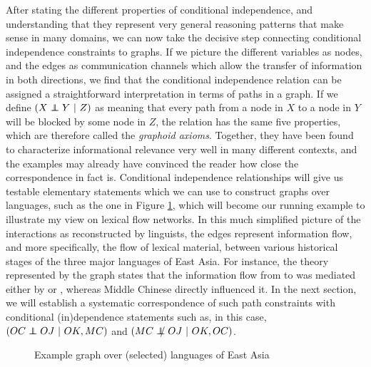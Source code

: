 After stating the different properties of conditional independence, and understanding that they represent very general reasoning patterns that make sense in many domains, we can now take the decisive step connecting conditional independence constraints to graphs. If we picture the different variables as nodes, and the edges as communication channels which allow the transfer of information in both directions, we find that the conditional independence relation can be assigned a straightforward interpretation in terms of paths in a graph. If we define $(X \independent Y\ |\ Z)$ as meaning that every path from a node in $X$ to a node in $Y$ will be blocked by some node in $Z$, the relation has the same five properties, which are therefore called the \textit{graphoid axioms}. Together, they have been found to characterize informational relevance very well in many different contexts, and the examples may already have convinced the reader how close the correspondence in fact is. Conditional 
independence relationships will give us testable elementary statements which we can use to construct graphs over languages, such as the one in Figure \ref{fig:langGraph}, which will become our running example to illustrate my view on lexical flow networks. In this much simplified picture of the interactions as reconstructed by linguists, the edges represent information flow, and more specifically, the flow of lexical material, between various historical stages of the three major languages of East Asia. For instance, the theory represented by the graph states that the information flow from  to  was mediated either by  or , whereas Middle Chinese directly influenced it. In the next section, we will establish a systematic correspondence of such path constraints with conditional (in)dependence statements such as, in this case, $(OC \independent OJ\ |\ OK, MC)$ and $(MC \notindep OJ\ |\ OK, OC)$.

\begin{figure}
 \caption{Example graph over (selected) languages of East Asia}
\label{fig:langGraph}
\end{figure}


